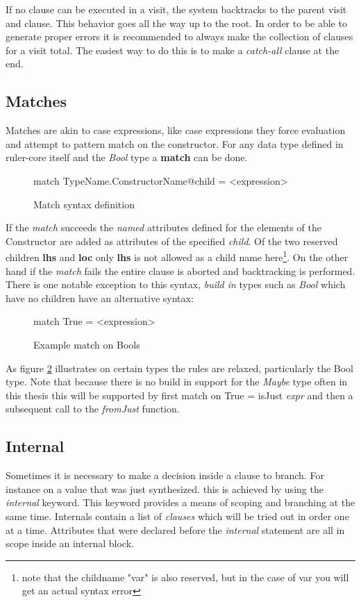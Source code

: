 If no clause can be executed in a visit, the system backtracks to the parent visit and clause. This behavior goes all the way up to the root. In order to be able to generate proper errors it is recommended to always make the collection of clauses for a visit total. The easiest way to do this is to make a \emph{catch-all} clause at the end.

\subsection{Matches}
Matches are akin to case expressions, like case expressions they force evaluation and attempt to pattern match on the constructor. For any data type defined in ruler-core itself and the \emph{Bool} type a \textbf{match} can be done.

\begin{figure}[h!]
\begin{code}
match TypeName.ConstructorName@child  = <expression>
\end{code}
\caption{Match syntax definition}
\label{match:syntax}
\end{figure}

If the \emph{match} succeeds the \emph{named} attributes defined for the elements of the Constructor are added as attributes of the specified \emph{child}. Of the two reserved children \textbf{lhs} and \textbf{loc} only \textbf{lhs} is not allowed as a child name here\footnote{note that the childname "var" is also reserved, but in the case of var you will get an actual syntax error}. On the other hand if the \emph{match} fails the entire clause is aborted and backtracking is performed.
There is one notable exception to this syntax, \emph{build in} types such as \emph{Bool} which have no children have an alternative syntax:

\begin{figure}[h!]
\begin{code}
match True = <expression>
\end{code}
\caption{Example match on Bools}
\label{match:bool}
\end{figure}

As figure \ref{match:bool} illustrates on certain types the rules are relaxed, particularly the Bool type. Note that because there is no build in support for the \emph{Maybe} type often in this thesis this will be supported by first match on True = isJust \emph{expr} and then a subsequent call to the \emph{fromJust} function.

\subsection{Internal}
Sometimes it is necessary to make a decision inside a clause to branch. For instance on a value that was just synthesized. this is achieved by using the \emph{internal} keyword. This keyword provides a means of scoping and branching at the same time. Internals contain a list of \emph{clauses} which will be tried out in order one at a time. Attributes that were declared before the \emph{internal} statement are all in scope inside an internal block. 

